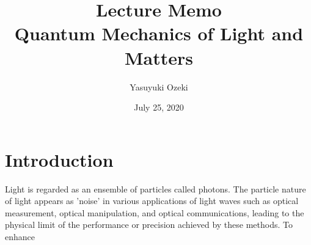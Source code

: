 \documentclass{book}
\begin{document}
\title{Lecture Memo \\ Quantum Mechanics of Light and Matters}
\author{Yasuyuki Ozeki}
\date{July 25, 2020}

\maketitle
\tableofcontents
\mainmatter

\chapter{Introduction}
Light is regarded as an ensemble of particles called photons. The particle nature of light appears as 'noise' in various applications of light waves such as optical measurement, optical manipulation, and optical communications, leading to the physical limit of the performance or precision achieved by these methods. To enhance 





\end{document}
